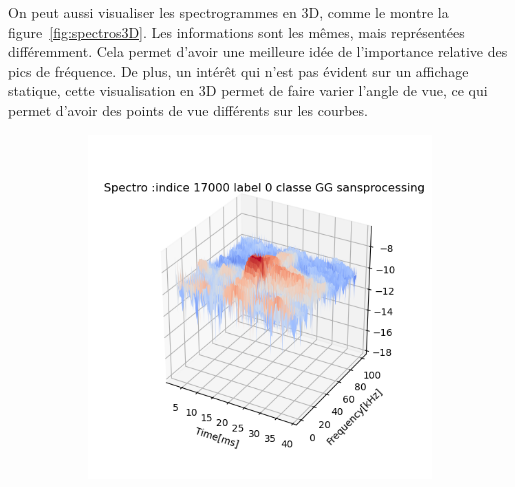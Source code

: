 On peut aussi visualiser les spectrogrammes en 3D, comme le montre la figure~\ref{fig:spectros3D}.
Les informations sont les mêmes, mais représentées différemment. 
Cela permet d'avoir une meilleure idée de l'importance relative des pics de fréquence.
De plus, un intérêt qui n'est pas évident sur un affichage statique, cette visualisation en 3D permet de faire varier l'angle de vue, ce qui permet d'avoir des points de vue différents sur les courbes.

\begin{figure}[!h]
  \centering
  \begin{subfigure}[l]{0.5\textwidth}
    \includegraphics[width=\textwidth]{./images/indice17000Spectro3Dlabel0classeGGsansprocessingsanszoom.png}
        \caption{}
  \end{subfigure}
  \newline
  \begin{subfigure}[l]{0.5\textwidth}

\end{subfigure}
\end{figure}
